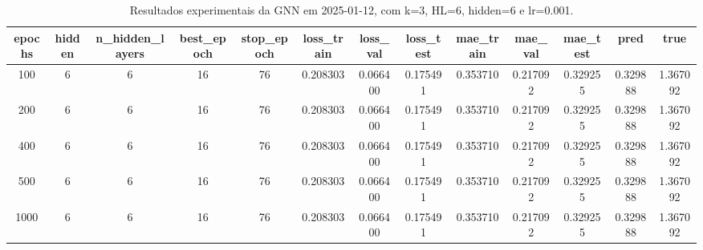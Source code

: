 \begin{table}[h]
\centering
\caption{Resultados experimentais da GNN em 2025-01-12, com k=3, HL=6, hidden=6 e lr=0.001.}
\label{tab:gnn_results_k3_hl6_h6_d20250112}
\begin{tabular}{ccccccccccccc}
\toprule
epochs & hidden & n\_hidden\_layers & best\_epoch & stop\_epoch & loss\_train & loss\_val & loss\_test & mae\_train & mae\_val & mae\_test & pred & true \\
\midrule
100 & 6 & 6 & 16 & 76 & 0.208303 & 0.066400 & 0.175491 & 0.353710 & 0.217092 & 0.329255 & 0.329888 & 1.367092 \\
200 & 6 & 6 & 16 & 76 & 0.208303 & 0.066400 & 0.175491 & 0.353710 & 0.217092 & 0.329255 & 0.329888 & 1.367092 \\
400 & 6 & 6 & 16 & 76 & 0.208303 & 0.066400 & 0.175491 & 0.353710 & 0.217092 & 0.329255 & 0.329888 & 1.367092 \\
500 & 6 & 6 & 16 & 76 & 0.208303 & 0.066400 & 0.175491 & 0.353710 & 0.217092 & 0.329255 & 0.329888 & 1.367092 \\
1000 & 6 & 6 & 16 & 76 & 0.208303 & 0.066400 & 0.175491 & 0.353710 & 0.217092 & 0.329255 & 0.329888 & 1.367092 \\
\bottomrule
\end{tabular}
\end{table}
